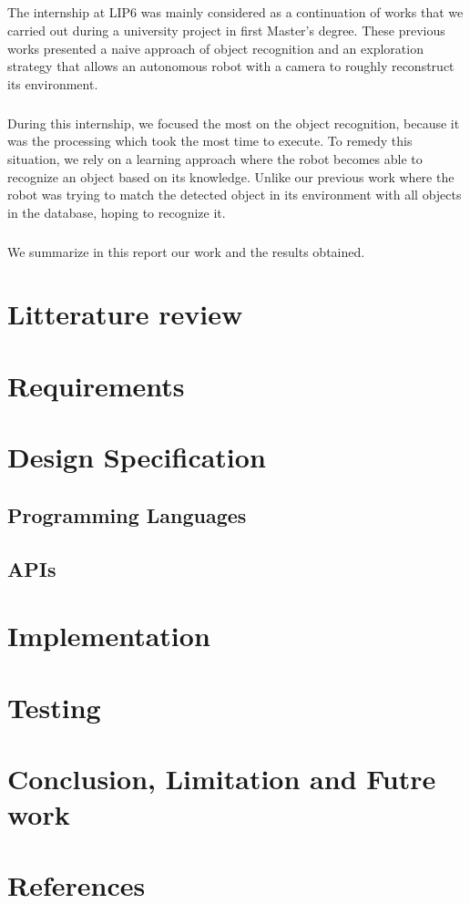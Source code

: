 \documentclass[12pt]{report}
\begin{document}
\paragraph{}
The internship at LIP6 was mainly considered as a continuation of works that we carried out during a university project in first Master's degree. These previous works presented a naive approach of object recognition and an exploration strategy that allows an autonomous robot with a camera to roughly reconstruct its environment.

\paragraph{}
During this internship, we focused the most on the object recognition, because it was the processing which took the most time to execute. To remedy this situation, we rely on a learning approach where the robot becomes able to recognize an object based on its knowledge. Unlike our previous work where the robot was trying to match the detected object in its environment with all objects in the database, hoping to recognize it.

\paragraph{}
We summarize in this report our work and the results obtained.

\chapter{Litterature review}

\chapter{Requirements}
\chapter{Design Specification}
\section{Programming Languages}
\section{APIs}
\chapter{Implementation}

\chapter{Testing}
\chapter{Conclusion, Limitation and Futre work}
\chapter{References}
\end{document}
